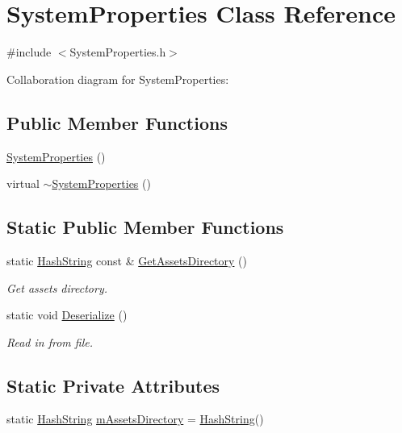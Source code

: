 \hypertarget{classSystemProperties}{}\section{System\+Properties Class Reference}
\label{classSystemProperties}


{\ttfamily \#include $<$System\+Properties.\+h$>$}



Collaboration diagram for System\+Properties\+:
\subsection*{Public Member Functions}
\begin{DoxyCompactItemize}
\item 
\hyperlink{classSystemProperties_a53435a32e5cbbdd8072e451dcc0e46a7}{System\+Properties} ()
\item 
virtual \hyperlink{classSystemProperties_acc559b25758642f5e298a23ae41dd99b}{$\sim$\+System\+Properties} ()
\end{DoxyCompactItemize}
\subsection*{Static Public Member Functions}
\begin{DoxyCompactItemize}
\item 
static \hyperlink{classHashString}{Hash\+String} const \& \hyperlink{classSystemProperties_ada4ec1c542a3c512e8bf829a73e300d1}{Get\+Assets\+Directory} ()
\begin{DoxyCompactList}\small\item\em Get assets directory. \end{DoxyCompactList}\item 
static void \hyperlink{classSystemProperties_acf1bdd6391382153ee783069dd189f88}{Deserialize} ()
\begin{DoxyCompactList}\small\item\em Read in from file. \end{DoxyCompactList}\end{DoxyCompactItemize}
\subsection*{Static Private Attributes}
\begin{DoxyCompactItemize}
\item 
static \hyperlink{classHashString}{Hash\+String} \hyperlink{classSystemProperties_a129fd3dcb632582fc582c56a697f4c8c}{m\+Assets\+Directory} = \hyperlink{classHashString}{Hash\+String}()
\end{DoxyCompactItemize}


